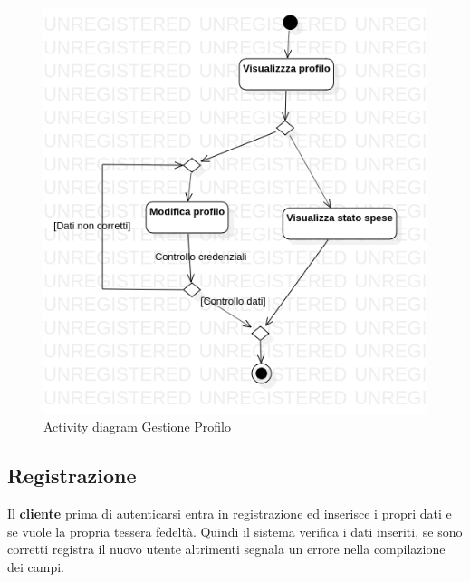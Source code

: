 \documentclass[12pt, a4paper]{report}
\begin{document}
\begin{figure}[h]
  \centering
  \includegraphics[width=\textwidth]{Use Case Model!Gestione profilo!Activity1!ActivityDiagramRegistrazione_6.png}
  \caption{Activity diagram Gestione Profilo}
\end{figure}

\newpage

\subsection{Registrazione}

Il \textbf{cliente} prima di autenticarsi entra in registrazione ed inserisce i
propri dati e se vuole la propria tessera fedeltà. Quindi il sistema verifica i
dati inseriti, se sono corretti registra il nuovo utente altrimenti segnala un
errore nella compilazione dei campi.
\end{document}
